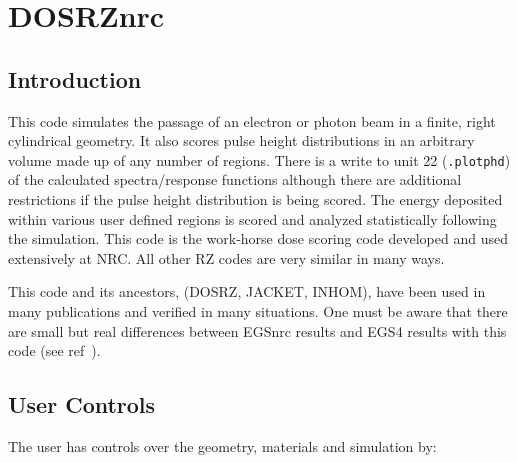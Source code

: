 \documentclass[12pt,twoside]{article}  %
\begin{document}
\section{DOSRZnrc}

\subsection{Introduction}

This code simulates the passage of an electron or photon beam in a finite,
right cylindrical geometry. It also scores pulse height distributions
in an arbitrary volume made up of any number of regions.  There is a
write to unit 22 ({\tt .plotphd}) of the calculated spectra/response
functions although there are additional restrictions if the pulse height
distribution is being scored.
The energy
deposited within various user defined regions is scored and analyzed
statistically following the simulation.  This code is the work-horse
dose scoring code developed and used extensively at NRC. All other RZ
codes are very similar in many ways.

This code and its ancestors, (DOSRZ, JACKET, INHOM),
have been used in many publications and verified in many
situations\cite{Ro82,Ro84a,RB85,SH86,RB86,RB90,KR93}.  One must be aware
that there are small but real differences between EGSnrc results and EGS4
results with this code (see ref~\cite{Wa00}).  


\subsection{User Controls}

The user has controls over the geometry, materials and 
simulation by:
\end{document}
